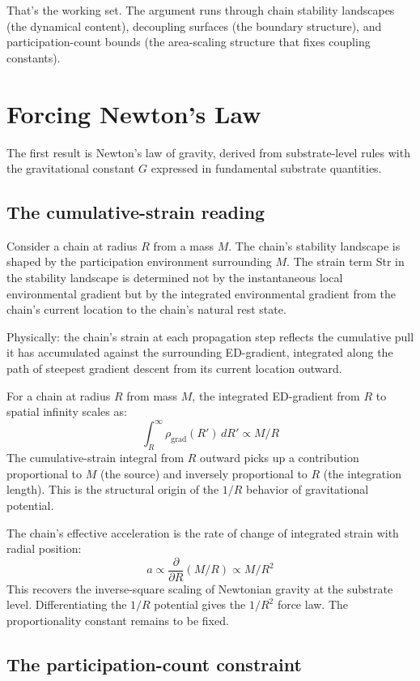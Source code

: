 \documentclass[11pt,a4paper]{article}
\begin{document}
That's the working set. The argument runs through chain stability landscapes (the dynamical content), decoupling surfaces (the boundary structure), and participation-count bounds (the area-scaling structure that fixes coupling constants).

\section{Forcing Newton's Law}

The first result is Newton's law of gravity, derived from substrate-level rules with the gravitational constant $G$ expressed in fundamental substrate quantities.

\subsection{The cumulative-strain reading}

Consider a chain at radius $R$ from a mass $M$. The chain's stability landscape is shaped by the participation environment surrounding $M$. The strain term Str in the stability landscape is determined not by the instantaneous local environmental gradient but by the integrated environmental gradient from the chain's current location to the chain's natural rest state.

Physically: the chain's strain at each propagation step reflects the cumulative pull it has accumulated against the surrounding ED-gradient, integrated along the path of steepest gradient descent from its current location outward.

For a chain at radius $R$ from mass $M$, the integrated ED-gradient from $R$ to spatial infinity scales as:
\[
\int_R^\infty \rho_{\mathrm{grad}}(R')\, dR' \propto M/R
\]
The cumulative-strain integral from $R$ outward picks up a contribution proportional to $M$ (the source) and inversely proportional to $R$ (the integration length). This is the structural origin of the $1/R$ behavior of gravitational potential.

The chain's effective acceleration is the rate of change of integrated strain with radial position:
\[
a \propto \frac{\partial}{\partial R} (M/R) \propto M/R^{2}
\]
This recovers the inverse-square scaling of Newtonian gravity at the substrate level. Differentiating the $1/R$ potential gives the $1/R^2$ force law. The proportionality constant remains to be fixed.

\subsection{The participation-count constraint}
\end{document}

